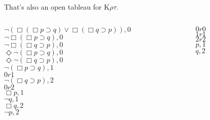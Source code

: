 \documentclass[
  14pt,
  letterpaper,
  ignorenonframetext,
]{beamer}
\begin{document}
\begin{frame}
That's also an open tableau for K\(\rho \tau\).

\begin{columns}[T]
\begin{column}{0.65\textwidth}
\begin{center}
$\neg(\Box(\Box p \supset q) \vee \Box(\Box q \supset p)), 0$ \\
$\neg \Box(\Box p \supset q), 0$ \\
$\neg \Box(\Box q \supset p), 0$ \\
$\Diamond \neg(\Box p \supset q), 0$ \\
$\Diamond \neg(\Box q \supset p), 0$ \\
$\neg(\Box p \supset q), 1$ \\
$0r1$ \\
$\neg(\Box q \supset p), 2$ \\
$0r2$ \\
$\Box p, 1$ \\
$\neg q, 1$ \\
$\Box q, 2$ \\
$\neg p, 2$ \\
\end{center}
\end{column}

\begin{column}{0.35\textwidth}
\begin{center}
$0r0$ \\
$1r1$ \\
$2r2$ \\
$p, 1$ \\
$q, 2$
\end{center}
\end{column}
\end{columns}
\end{frame}
\end{document}

